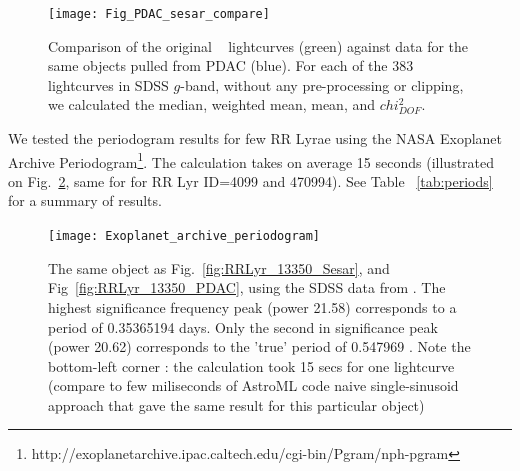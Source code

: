 \documentclass[fleqn,usenatbib]{mnras} %
\begin{document}
\begin{figure}
\texttt{[image: Fig\_PDAC\_sesar\_compare]}
\caption{Comparison of the original ~\citep{sesar2010}  lightcurves (green) against data for the same objects  pulled from PDAC (blue). For each of the 383 lightcurves in SDSS $g$-band, without any pre-processing or clipping, we calculated the median, weighted mean, mean, and $chi^{2}_{DOF}$. }
\label{fig:PDAC_SDSS_comp}
\end{figure}




We tested the periodogram results for few RR Lyrae using the NASA Exoplanet Archive Periodogram\footnote{http://exoplanetarchive.ipac.caltech.edu/cgi-bin/Pgram/nph-pgram}. The calculation takes on average  15 seconds (illustrated on Fig.~\ref{fig:exoplanet_archive}, same for for RR Lyr ID=4099 and 470994). See Table ~\ref{tab:periods} for a summary of results. 

\begin{figure}
\texttt{[image: Exoplanet\_archive\_periodogram]}
\caption{ The same object as Fig.~\ref{fig:RRLyr_13350_Sesar}, and Fig~\ref{fig:RRLyr_13350_PDAC},  using  the SDSS data from \citep{sesar2010}.  The highest significance frequency peak (power 21.58) corresponds to  a period of 0.35365194 days. Only the second in significance peak (power 20.62) corresponds to the 'true' period of 0.547969 \citep{sesar2010}. Note the bottom-left corner : the calculation took 15 secs for one lightcurve (compare to few miliseconds of AstroML code naive single-sinusoid approach that gave the same result for this particular object) }
\label{fig:exoplanet_archive}
\end{figure}
\end{document}

